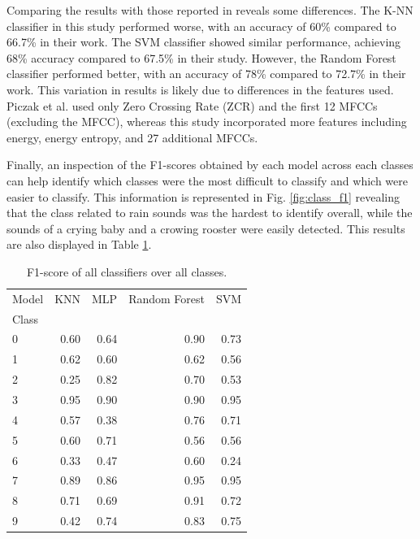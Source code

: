 \documentclass[journal]{IEEEtran}
\begin{document}
Comparing the results with those reported in \cite{esc-50} reveals some differences. The K-NN classifier in this study performed worse, with an accuracy of 60\% compared to 66.7\% in their work. The SVM classifier showed similar performance, achieving 68\% accuracy compared to 67.5\% in their study. However, the Random Forest classifier performed better, with an accuracy of 78\% compared to 72.7\% in their work. This variation in results is likely due to differences in the features used. Piczak et al. used only Zero Crossing Rate (ZCR) and the first 12 MFCCs (excluding the  MFCC), whereas this study incorporated more features including energy, energy entropy, and 27 additional MFCCs.

Finally, an inspection of the F1-scores obtained by each model across each classes can help identify which classes were the most difficult to classify and which were easier to classify. This information is represented in Fig. \ref{fig:class_f1} revealing that the class related to rain sounds was the hardest to identify overall, while the sounds of a crying baby and a crowing rooster were easily detected. This results are also displayed in Table \ref{tab:f1-scores}.
\begin{table}[t]
\centering
\caption{F1-score of all classifiers over all classes.}
\begin{tabular}{lrrrr}
\toprule
Model & KNN & MLP & Random Forest & SVM \\
Class &  &  &  &  \\
\midrule
0 & 0.60 & 0.64 & 0.90 & 0.73 \\
1 & 0.62 & 0.60 & 0.62 & 0.56 \\
2 & 0.25 & 0.82 & 0.70 & 0.53 \\
3 & 0.95 & 0.90 & 0.90 & 0.95 \\
4 & 0.57 & 0.38 & 0.76 & 0.71 \\
5 & 0.60 & 0.71 & 0.56 & 0.56 \\
6 & 0.33 & 0.47 & 0.60 & 0.24 \\
7 & 0.89 & 0.86 & 0.95 & 0.95 \\
8 & 0.71 & 0.69 & 0.91 & 0.72 \\
9 & 0.42 & 0.74 & 0.83 & 0.75 \\
\bottomrule
\end{tabular}
\label{tab:f1-scores}
\end{table}
\end{document}
